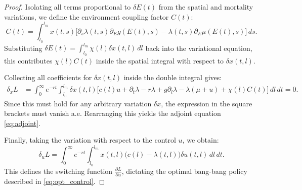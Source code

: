\documentclass[10pt,a4paper]{amsart}
\begin{document}
\begin{proof}
Isolating all terms proportional to $\delta E(t)$ from the spatial and mortality variations, we define the environment coupling factor $C(t)$:
\[
C(t) = \int_{l_0}^{l_m} x(t,s)\Big[ \partial_s\lambda(t,s)\partial_Eg(E(t),s) - \lambda(t,s)\partial_E\mu(E(t),s) \Big]\,ds.
\]
Substituting $\delta E(t) = \int_{l_0}^{l_m} \chi(l)\delta x(t,l)\,dl$ back into the variational equation, this contributes $\chi(l)C(t)$ inside the spatial integral with respect to $\delta x(t,l)$.

Collecting all coefficients for $\delta x(t,l)$ inside the double integral gives:
\begin{align*}
\delta_x L &= \int_0^\infty e^{-rt} \int_{l_0}^{l_m} \delta x(t,l) \Bigg[ c(l)u + \partial_t \lambda - r\lambda + g\partial_l\lambda - \lambda(\mu + u) + \chi(l)C(t) \Bigg]\,dl\,dt = 0.
\end{align*}
Since this must hold for any arbitrary variation $\delta x$, the expression in the square brackets must vanish a.e. Rearranging this yields the adjoint equation \eqref{eq:adjoint}.

Finally, taking the variation with respect to the control $u$, we obtain:
\[
\delta_u L = \int_0^\infty e^{-rt} \int_{l_0}^{l_m} x(t,l)\big( c(l) - \lambda(t,l) \big)\delta u(t,l)\,dl\,dt.
\]
This defines the switching function $\frac{\partial L}{\partial u}$, dictating the optimal bang-bang policy described in \eqref{eq:opt_control}.
\end{proof}
\end{document}
